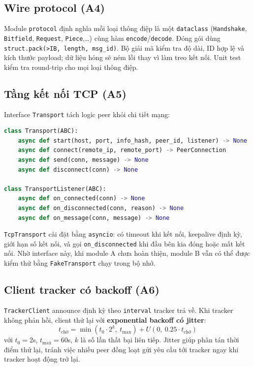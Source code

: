 \documentclass[12pt,a4paper,oneside]{report}
\begin{document}
\subsection{Wire protocol (A4)}
Module \texttt{protocol} định nghĩa mỗi loại thông điệp là một \texttt{dataclass} (\texttt{Handshake}, \texttt{Bitfield}, \texttt{Request}, \texttt{Piece},\dots) cùng hàm \texttt{encode}/\texttt{decode}. Đóng gói dùng \texttt{struct.pack({}>IB{}, length, msg\_id)}. Bộ giải mã kiểm tra độ dài, ID hợp lệ và kích thước payload; dữ liệu hỏng sẽ ném lỗi thay vì làm treo kết nối. Unit test kiểm tra round-trip cho mọi loại thông điệp.

\subsection{Tầng kết nối TCP (A5)}
Interface \texttt{Transport} tách logic peer khỏi chi tiết mạng:
\begin{lstlisting}[language=Python]
class Transport(ABC):
    async def start(host, port, info_hash, peer_id, listener) -> None
    async def connect(remote_ip, remote_port) -> PeerConnection
    async def send(conn, message) -> None
    async def disconnect(conn) -> None

class TransportListener(ABC):
    async def on_connected(conn) -> None
    async def on_disconnected(conn, reason) -> None
    async def on_message(conn, message) -> None
\end{lstlisting}
\texttt{TcpTransport} cài đặt bằng \texttt{asyncio}: có timeout khi kết nối, keepalive định kỳ, giới hạn số kết nối, và gọi \texttt{on\_disconnected} khi đầu bên kia đóng hoặc mất kết nối. Nhờ interface này, khi module A chưa hoàn thiện, module B vẫn có thể được kiểm thử bằng \texttt{FakeTransport} chạy trong bộ nhớ.

\subsection{Client tracker có backoff (A6)}
\texttt{TrackerClient} announce định kỳ theo \texttt{interval} tracker trả về. Khi tracker không phản hồi, client thử lại với \textbf{exponential backoff có jitter}:
\[
  t_{\text{chờ}} = \min\!\left(t_0 \cdot 2^{k},\ t_{\max}\right) + U\!\left(0,\ 0.25\cdot t_{\text{chờ}}\right)
\]
với $t_0 = 2$s, $t_{\max} = 60$s, $k$ là số lần thất bại liên tiếp. Jitter giúp phân tán thời điểm thử lại, tránh việc nhiều peer đồng loạt gửi yêu cầu tới tracker ngay khi tracker hoạt động trở lại.
\end{document}
